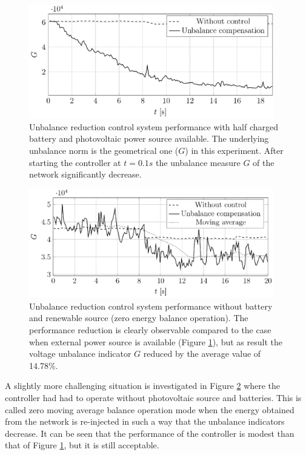             \begin{figure}[ht]
            \centering
            \includegraphics[width=0.95\textwidth]{Unblance_EPS_Pics/UnbalRedComp_JCP-figure3.eps}
            \caption{Unbalance reduction control system performance with half charged battery and photovoltaic power source available. The underlying unbalance norm is the geometrical one ($G$) in this experiment. After starting the controller at $t=0.1s$ the unbalance measure $G$ of the network significantly decrease.}
            \label{fig:compare_asym_PV}
            \end{figure}

            \begin{figure}[ht]
            \centering
            \includegraphics[width=0.95\textwidth]{Unblance_EPS_Pics/UnbalRedComp_JCP-figure4.eps}
            \caption{Unbalance reduction control system performance without battery and renewable source (zero energy balance operation). The performance reduction is clearly observable compared to the case when external power source is available (Figure \ref{fig:compare_asym_PV}), but as result the voltage unbalance indicator $G$ reduced by the average value of 14.78\%.}
            \label{fig:compare_asym}
            \end{figure}

            A slightly more challenging situation is investigated in Figure \ref{fig:compare_asym} where the controller had had to operate without photovoltaic source and batteries. This is called zero moving average balance operation mode when the energy obtained from the network is re-injected in such a way that the unbalance indicators decrease. It can be seen that the performance of the controller is modest than that of Figure \ref{fig:compare_asym_PV}, but it is still acceptable.

